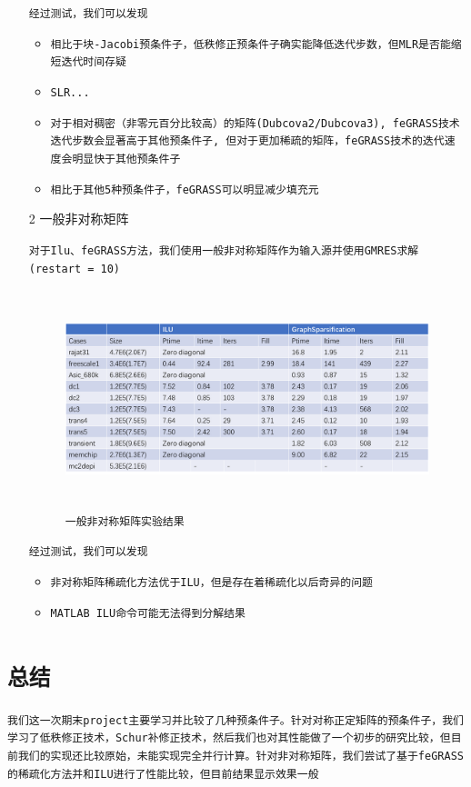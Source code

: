 \documentclass[11pt, a4paper]{article}
\theoremstyle{plain}
\theoremstyle{plain}
\theoremstyle{plain}
\theoremstyle{definition}
\theoremstyle{remark}
\theoremstyle{definition}
\newcommand{\T}[1]{\texttt{#1}}
\begin{document}
\begin{itemize}
	\T{经过测试，我们可以发现}
	\begin{itemize}
		\item \T{相比于块-Jacobi预条件子，低秩修正预条件子确实能降低迭代步数，但MLR是否能缩短迭代时间存疑}
		
		\item \T{SLR...}
		
		\item \T{对于相对稠密（非零元百分比较高）的矩阵(Dubcova2/Dubcova3), feGRASS技术迭代步数会显著高于其他预条件子, 但对于更加稀疏的矩阵，feGRASS技术的迭代速度会明显快于其他预条件子}
		
		\item \T{相比于其他5种预条件子，feGRASS可以明显减少填充元}
	\end{itemize}
	
	
	
	\item[2] 一般非对称矩阵
	
	\T{对于Ilu、feGRASS方法，我们使用一般非对称矩阵作为输入源并使用GMRES求解(restart = 10)}
	\begin{figure}[H]
		\caption{\T{一般非对称矩阵实验结果}}
		\centering
		\includegraphics[width=350pt,height=180pt]{normal.png}
	\end{figure}
	\T{经过测试，我们可以发现}
	\begin{itemize}
		\item \T{非对称矩阵稀疏化方法优于ILU，但是存在着稀疏化以后奇异的问题}
		\item \T{MATLAB ILU命令可能无法得到分解结果}
	\end{itemize}

\end{itemize}




\section*{\T{总结}}
\T{我们这一次期末project主要学习并比较了几种预条件子。针对对称正定矩阵的预条件子，我们学习了低秩修正技术，Schur补修正技术，然后我们也对其性能做了一个初步的研究比较，但目前我们的实现还比较原始，未能实现完全并行计算。针对非对称矩阵，我们尝试了基于feGRASS的稀疏化方法并和ILU进行了性能比较，但目前结果显示效果一般}


\renewcommand{\refname}{\T{参考文献}}


\end{document}
